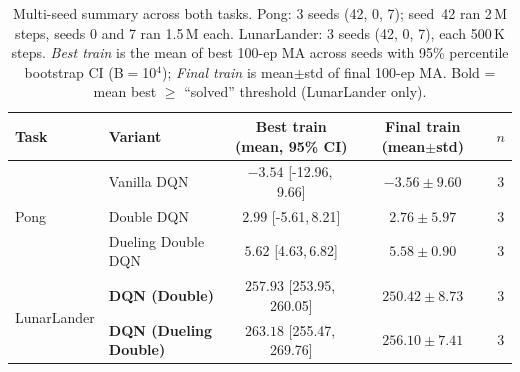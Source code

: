 \begin{table}[h]\centering\footnotesize
\caption{Multi-seed summary across both tasks. Pong: 3 seeds (42, 0, 7); seed~42 ran 2\,M steps, seeds 0 and 7 ran 1.5\,M each. LunarLander: 3 seeds (42, 0, 7), each 500\,K steps. \emph{Best train} is the mean of best 100-ep MA across seeds with 95\% percentile bootstrap CI (B$=$10$^{4}$); \emph{Final train} is mean$\pm$std of final 100-ep MA. Bold = mean best $\geq$ ``solved'' threshold (LunarLander only).}
\label{tab:multiseed}
\begin{tabular}{llccc}
\toprule
Task & Variant & Best train (mean, 95\% CI) & Final train (mean$\pm$std) & $n$ \\
\midrule
\multirow{3}{*}{Pong}
  & Vanilla DQN & $-3.54$ [-12.96,\,9.66] & $-3.56\pm9.60$ & 3 \\
  & Double DQN & $2.99$ [-5.61,\,8.21] & $2.76\pm5.97$ & 3 \\
  & Dueling Double DQN & $5.62$ [4.63,\,6.82] & $5.58\pm0.90$ & 3 \\
\midrule
\multirow{2}{*}{LunarLander}
  & \textbf{DQN (Double)} & $\mathbf{257.93}$ [253.95,\,260.05] & $250.42\pm8.73$ & 3 \\
  & \textbf{DQN (Dueling Double)} & $\mathbf{263.18}$ [255.47,\,269.76] & $256.10\pm7.41$ & 3 \\
\bottomrule
\end{tabular}
\end{table}
